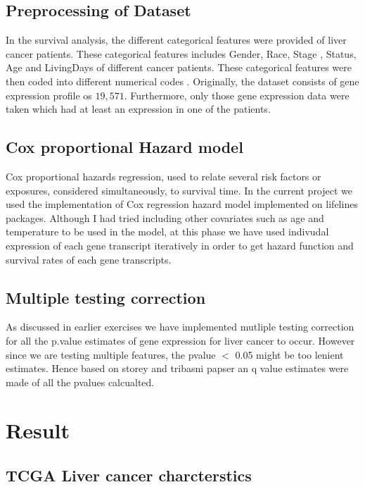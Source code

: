 \documentclass[a4paper,10pt]{article}
\begin{document}
	\subsection {Preprocessing of Dataset}
In the survival analysis, the different categorical features were provided of liver cancer patients. These categorical features includes Gender, Race, Stage , Status, Age and LivingDays of different cancer patients.  These categorical features were then coded into different numerical codes . Originally, the dataset consists of gene expression profile os $19,571$. Furthermore, only those gene expression data were taken which had at least an expression in one of the patients.  

	\subsection{Cox proportional Hazard model}
	 Cox proportional hazards regression, used to relate several risk factors or exposures, considered simultaneously, to survival time. In the current project we used the implementation of Cox regression hazard model implemented on lifelines packages. Although I had tried including other covariates such as age and temperature to be used in the model, at this phase we have used indivudal expression of each gene transcript iteratively in order to get hazard function and survival rates of each gene transcripts. 
	 
	\subsection {Multiple testing correction}
	As discussed in earlier exercises we have  implemented mutliple testing correction for all the p.value estimates of gene expression for liver cancer to occur. However since we are testing multiple features, the pvalue $<$ 0.05 might be too lenient estimates. Hence based on storey and tribasni papser \cite {} an q value estimates were made of all the pvalues calcualted.
	 


 \section{Result}
 
 	\subsection {TCGA Liver cancer charcterstics}
 
\end{document}
